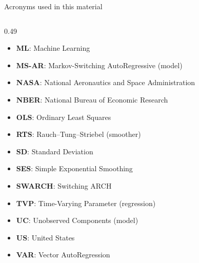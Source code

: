\begin{frame}{Acronyms used in this material}
\begin{columns}[T]
\begin{column}{0.49\textwidth}
\begin{itemize}
    \item \textbf{ML}: Machine Learning
    \item \textbf{MS-AR}: Markov-Switching AutoRegressive (model)
    \item \textbf{NASA}: National Aeronautics and Space Administration
    \item \textbf{NBER}: National Bureau of Economic Research
    \item \textbf{OLS}: Ordinary Least Squares
    \item \textbf{RTS}: Rauch–Tung–Striebel (smoother)
    \item \textbf{SD}: Standard Deviation
    \item \textbf{SES}: Simple Exponential Smoothing
    \item \textbf{SWARCH}: Switching ARCH
    \item \textbf{TVP}: Time-Varying Parameter (regression)
    \item \textbf{UC}: Unobserved Components (model)
    \item \textbf{US}: United States
    \item \textbf{VAR}: Vector AutoRegression
\end{itemize}
\end{column}
\end{columns}
\end{frame}

